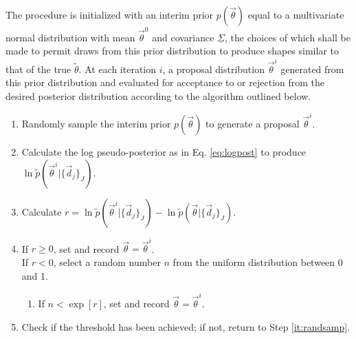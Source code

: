 \documentclass[preprint]{aastex}
\newcommand{\textul}{\underline}
\begin{document}
The procedure is initialized with an interim prior $p(\vec{\theta})$ equal to a multivariate normal distribution with mean $\vec{\theta}^{0}$ and covariance $\textul{\Sigma}$, the choices of which shall be made to permit draws from this prior distribution to produce shapes similar to that of the true $\tilde{\theta}$.  At each iteration $i$, a proposal distribution $\vec{\theta}^{i}$ generated from this prior distribution and evaluated for acceptance to or rejection from the desired posterior distribution according to the algorithm outlined below.  %


\begin{enumerate}
\item \label{it:randsamp} Randomly sample the interim prior $p(\vec{\theta})$ to generate a proposal $\vec{\theta}^{i}$.
\item Calculate the log pseudo-posterior as in Eq. \ref{eq:logpost} to produce $\ln\tilde{p}(\vec{\theta}^{i}|\{\vec{d}_{j}\}_{J})$.
\item Calculate $r=\ln\tilde{p}(\vec{\theta}^{i}|\{\vec{d}_{j}\}_{J})-\ln\tilde{p}(\vec{\theta}|\{\vec{d}_{j}\}_{J})$.
\item If $r\geq0$, set and record $\vec{\theta}=\vec{\theta}^{i}$.\\
If $r<0$, select a random number $n$ from the uniform distribution between 0 and 1.
\begin{enumerate}
\item If $n<\exp[r]$, set and record $\vec{\theta}=\vec{\theta}^{i}$.
\end{enumerate}
\item Check if the threshold has been achieved; if not, return to Step \ref{it:randsamp}.
\end{enumerate}

\end{document}

